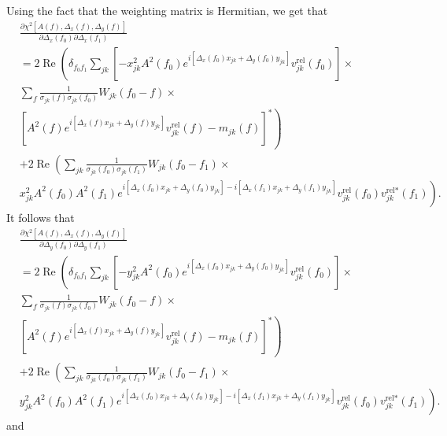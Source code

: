 \documentclass{article}
\newcommand\re{\operatorname{Re}}
\begin{document}
Using the fact that the weighting matrix is Hermitian, we get that
\begin{equation}
\begin{split}
    &\frac{\partial \chi^2[A(f), \Delta_x(f), \Delta_y(f)]}{\partial \Delta_x(f_0) \partial \Delta_x(f_1)} \\
    & = 2 \re \left( \delta_{f_0 f_1} \sum_{jk} \left[ - x^2_{jk} A^2(f_0) e^{i[\Delta_x(f_0) x_{jk} + \Delta_y(f_0) y_{jk}]} v^\text{rel}_{jk}(f_0) \right] \times \right. \\
     &\sum_{f}  \frac{1}{\sigma_{jk}(f)\sigma_{jk}(f_0)} W_{jk}(f_0-f) \times \\
    & \left. \left[ A^2(f) e^{i[\Delta_x(f) x_{jk} + \Delta_y(f) y_{jk}]} v^\text{rel}_{jk}(f) - m_{jk}(f) \right]^* \right) \\
    & + 2 \re \left( \sum_{jk} \frac{1}{\sigma_{jk}(f_0)\sigma_{jk}(f_1)} W_{jk}(f_0-f_1) \times \right. \\
    & \left. x^2_{jk} A^2(f_0) A^2(f_1) e^{i[\Delta_x(f_0) x_{jk} + \Delta_y(f_0) y_{jk}]-i[\Delta_x(f_1) x_{jk} + \Delta_y(f_1) y_{jk}]} v^\text{rel}_{jk}(f_0) v^{\text{rel}*}_{jk}(f_1) \right).
\end{split}
\end{equation}
It follows that 
\begin{equation}
\begin{split}
    &\frac{\partial \chi^2[A(f), \Delta_x(f), \Delta_y(f)]}{\partial \Delta_y(f_0) \partial \Delta_y(f_1)} \\
    & = 2 \re \left( \delta_{f_0 f_1} \sum_{jk} \left[ - y^2_{jk} A^2(f_0) e^{i[\Delta_x(f_0) x_{jk} + \Delta_y(f_0) y_{jk}]} v^\text{rel}_{jk}(f_0) \right] \times \right. \\
     &\sum_{f}  \frac{1}{\sigma_{jk}(f)\sigma_{jk}(f_0)} W_{jk}(f_0-f) \times \\
    & \left. \left[ A^2(f) e^{i[\Delta_x(f) x_{jk} + \Delta_y(f) y_{jk}]} v^\text{rel}_{jk}(f) - m_{jk}(f) \right]^* \right) \\
    & + 2 \re \left( \sum_{jk} \frac{1}{\sigma_{jk}(f_0)\sigma_{jk}(f_1)} W_{jk}(f_0-f_1) \times \right. \\
    & \left. y^2_{jk} A^2(f_0) A^2(f_1) e^{i[\Delta_x(f_0) x_{jk} + \Delta_y(f_0) y_{jk}]-i[\Delta_x(f_1) x_{jk} + \Delta_y(f_1) y_{jk}]} v^\text{rel}_{jk}(f_0) v^{\text{rel}*}_{jk}(f_1) \right).
\end{split}
\end{equation}
and
\end{document}
